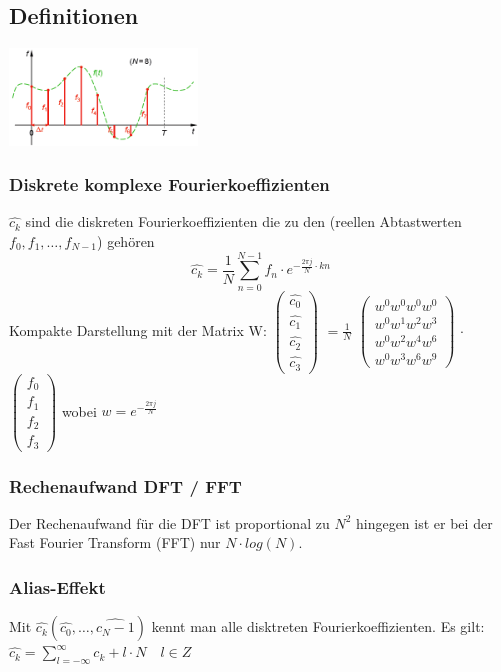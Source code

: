 \newpage 
{}
\subsection{Definitionen}
\includegraphics[width=5cm]{./bilder/abtastung.png}

\subsubsection{Diskrete komplexe Fourierkoeffizienten}
$\hat{c_k}$ sind die diskreten Fourierkoeffizienten die zu den (reellen
Abtastwerten $f_0, f_1,\ldots,f_{N-1}$) gehören\\
$$\hat{c_k}=\frac{1}{N}\sum\limits_{n=0}^{N-1}f_n\cdot e^{-\frac{2\pi j}{N}\cdot
kn}$$
Kompakte Darstellung mit der Matrix W:
$\begin{pmatrix}
 \hat{c_0}\\\hat{c_1}\\\hat{c_2}\\\hat{c_3}
\end{pmatrix}$
$=\frac{1}{N}$
$\begin{pmatrix}
 w^0w^0w^0w^0\\w^0w^1w^2w^3\\w^0w^2w^4w^6\\w^0w^3w^6w^9
\end{pmatrix}$
$\cdot$
$\begin{pmatrix}
 f_0\\f_1\\f_2\\f_3
\end{pmatrix}$
wobei $w=e^{-\frac{2\pi j}{N}}$

\subsubsection{Rechenaufwand DFT / FFT}
Der Rechenaufwand für die DFT ist proportional zu $N^2$ 
hingegen ist er bei der Fast Fourier Transform (FFT) nur $N\cdot log(N)$.

\subsubsection{Alias-Effekt}
Mit $\hat{c_k}(\hat{c_0},\ldots,\hat{c_N-1})$ kennt man alle disktreten Fourierkoeffizienten. Es gilt:
$\hat{c_k}=\sum\limits_{l=-\infty}^{\infty}c_k+l\cdot N \quad l\in Z$


